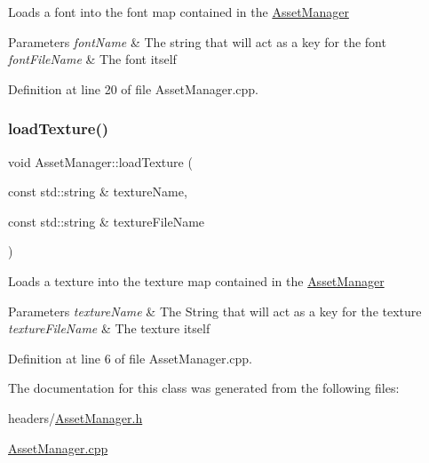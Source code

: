 Loads a font into the font map contained in the \mbox{\hyperlink{class_asset_manager}{Asset\+Manager}} 
\begin{DoxyParams}{Parameters}
{\em font\+Name} & The string that will act as a key for the font \\
\hline
{\em font\+File\+Name} & The font itself \\
\hline
\end{DoxyParams}


Definition at line 20 of file Asset\+Manager.\+cpp.

\mbox{\label{class_asset_manager_ae34adbfa6d97e61fb19fa309f07d82b7}} 
\subsubsection{\texorpdfstring{loadTexture()}{loadTexture()}}
{\footnotesize\ttfamily void Asset\+Manager\+::load\+Texture (\begin{DoxyParamCaption}\item[{const std\+::string \&}]{texture\+Name,  }\item[{const std\+::string \&}]{texture\+File\+Name }\end{DoxyParamCaption})}

Loads a texture into the texture map contained in the \mbox{\hyperlink{class_asset_manager}{Asset\+Manager}} 
\begin{DoxyParams}{Parameters}
{\em texture\+Name} & The String that will act as a key for the texture \\
\hline
{\em texture\+File\+Name} & The texture itself \\
\hline
\end{DoxyParams}


Definition at line 6 of file Asset\+Manager.\+cpp.



The documentation for this class was generated from the following files\+:\begin{DoxyCompactItemize}
\item 
headers/\mbox{\hyperlink{_asset_manager_8h}{Asset\+Manager.\+h}}\item 
\mbox{\hyperlink{_asset_manager_8cpp}{Asset\+Manager.\+cpp}}\end{DoxyCompactItemize}
